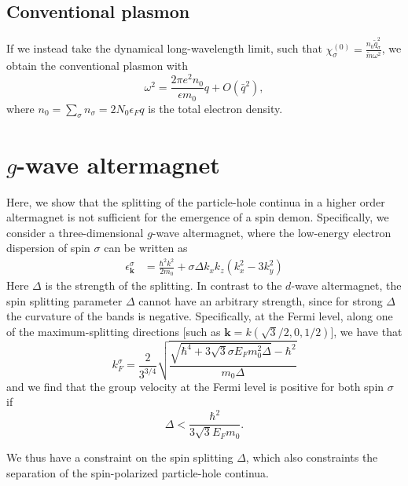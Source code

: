 \documentclass[aps,prb,reprint,twocolumns,superscriptaddress,nofootinbib]{revtex4-2}
\newcommand{\mdos}{\tilde{m}}
\newcommand{\kF}{k_{F}}
\begin{document}
	\subsection{Conventional plasmon}
	If we instead take the dynamical long-wavelength limit, such that $\chi_{\sigma}^{(0)}=\frac{n_0 \tilde q_\sigma^2}{\mdos \omega^2}$, we obtain the conventional plasmon with
	\begin{equation}
		\omega^2 = \frac{2\pi e^2n_0}{\epsilon m_0} q + O(\bar q^2),
	\end{equation}
	where $n_0=\sum_\sigma n_\sigma=2N_0\epsilon_Fq$ is the total electron density.
	
	
	
	\section{$g$-wave altermagnet}
	Here, we show that the splitting of the particle-hole continua in a higher order altermagnet is not sufficient for the emergence of a spin demon. Specifically, we consider a three-dimensional $g$-wave altermagnet, where the low-energy electron dispersion of spin $\sigma$ can be written as \cite{smejkalConventionalFerromagnetismAntiferromagnetism2022}
	\begin{align}
		\epsilon_{\bm k}^\sigma &= \frac{\hbar^2 k^2}{2m_0} + \sigma \Delta  k_xk_z\left(k_x^2-3k_y^2\right)
	\end{align}
	Here $\Delta$ is the strength of the splitting. In contrast to the $d$-wave altermagnet, the spin splitting parameter $\Delta$ cannot have an arbitrary strength, since for strong  $\Delta$ the curvature of the bands is negative. Specifically, at the Fermi level, along one of the maximum-splitting directions [such as $\bm k = k  (\sqrt{3}/2,0,1/2)$], we have that 
	\begin{equation}
		\kF^\sigma = \frac{2}{3^{3/4}} \sqrt{\frac{\sqrt{\hbar^4+ 3\sqrt{3}\sigma E_Fm_0^2 \Delta  }-\hbar^2}{m_0 \Delta} } \label{eq:kF-g-wave}
	\end{equation}
	and we find that the group velocity at the Fermi level is positive for both spin $\sigma$ if
	\begin{equation}
		\Delta < \frac{\hbar^2}{3\sqrt{3}E_F m_0 }. \label{eq:delta-condition}
	\end{equation}
	
	We thus have a constraint on the spin splitting $\Delta$, which also constraints the separation of the spin-polarized particle-hole continua.  
	
\end{document}

